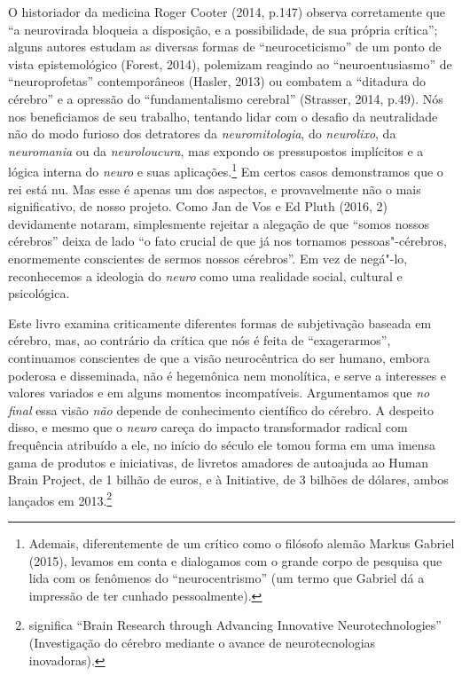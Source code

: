 O historiador da medicina Roger Cooter (2014, p.147) observa
corretamente que ``a neurovirada bloqueia a disposição, e a
possibilidade, de sua própria crítica''; alguns autores estudam as
diversas formas de ``neuroceticismo'' de um ponto de vista
epistemológico (Forest, 2014), polemizam reagindo ao ``neuroentusiasmo''
de ``neuroprofetas'' contemporâneos (Hasler, 2013) ou combatem a
``ditadura do cérebro'' e a opressão do ``fundamentalismo cerebral''
(Strasser, 2014, p.49). Nós nos beneficiamos de seu trabalho, tentando
lidar com o desafio da neutralidade não do modo furioso dos detratores
da \emph{neuromitologia}, do \emph{neurolixo}, da \emph{neuromania} ou
da \emph{neuroloucura}, mas expondo os pressupostos implícitos e a
lógica interna do \emph{neuro} e suas aplicações.\footnote{Ademais, diferentemente de um crítico como o filósofo alemão Markus
Gabriel (2015), levamos em conta e dialogamos com o grande corpo de
pesquisa que lida com os fenômenos do ``neurocentrismo'' (um termo que
Gabriel dá a impressão de ter cunhado pessoalmente).} Em
certos casos demonstramos que o rei está nu. Mas esse é apenas um dos
aspectos, e provavelmente não o mais significativo, de nosso projeto.
Como Jan de Vos e Ed Pluth (2016, 2) devidamente notaram, simplesmente
rejeitar a alegação de que ``somos nossos cérebros'' deixa de lado ``o
fato crucial de que já nos tornamos pessoas"-cérebros, enormemente
conscientes de sermos nossos cérebros''. Em vez de negá"-lo, reconhecemos
a ideologia do \emph{neuro} como uma realidade social, cultural e
psicológica.

Este livro examina criticamente diferentes formas de subjetivação
baseada em cérebro, mas, ao contrário da crítica que nós é feita de
``exagerarmos'', continuamos conscientes de que a visão neurocêntrica do
ser humano, embora poderosa e disseminada, não é hegemônica nem
monolítica, e serve a interesses e valores variados e em alguns momentos
incompatíveis. Argumentamos que \emph{no final} essa visão \emph{não}
depende de conhecimento científico do cérebro. A despeito disso, e mesmo
que o \emph{neuro} careça do impacto transformador radical com
frequência atribuído a ele, no início do século  ele tomou forma em
uma imensa gama de produtos e iniciativas, de livretos amadores de
autoajuda ao Human Brain Project, de 1 bilhão de euros, e à 
Initiative, de 3 bilhões de dólares, ambos lançados em
2013.\footnote{ significa ``Brain Research through Advancing Innovative
Neurotechnologies'' (Investigação do cérebro mediante o avance de
neurotecnologias inovadoras).}

